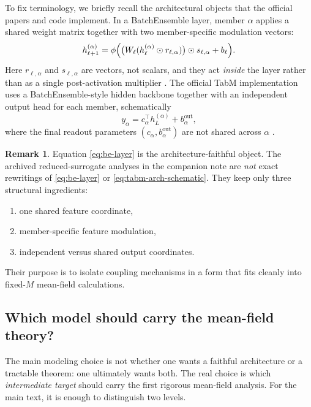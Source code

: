 \documentclass[11pt]{article}
\theoremstyle{definition}
\newtheorem{remark}[theorem]{Remark}
\begin{document}
To fix terminology, we briefly recall the architectural objects that the official papers and code implement.
In a BatchEnsemble layer, member $\alpha$ applies a shared weight matrix together with two member-specific modulation vectors:
\begin{equation}
  h_{\ell+1}^{(\alpha)}
  =
  \phi\Bigl(
    \bigl(
      W_\ell(h_\ell^{(\alpha)}\odot r_{\ell,\alpha})
    \bigr)
    \odot s_{\ell,\alpha}
    +
    b_\ell
  \Bigr).
  \label{eq:be-layer}
\end{equation}
Here $r_{\ell,\alpha}$ and $s_{\ell,\alpha}$ are vectors, not scalars,
and they act \emph{inside} the layer rather than as a single post-activation multiplier
\cite{batchensemble}.
The official TabM implementation uses a BatchEnsemble-style hidden backbone together with an independent output head for each member,
schematically
\begin{equation}
  y_\alpha
  =
  c_\alpha^\top h_L^{(\alpha)} + b_\alpha^{\mathrm{out}},
  \label{eq:tabm-arch-schematic}
\end{equation}
where the final readout parameters $(c_\alpha,b_\alpha^{\mathrm{out}})$ are not shared across $\alpha$
\cite{tabm,tabm-repo}.

\begin{remark}
Equation \eqref{eq:be-layer} is the architecture-faithful object.
The archived reduced-surrogate analyses in the companion note are \emph{not} exact rewritings of \eqref{eq:be-layer} or \eqref{eq:tabm-arch-schematic}.
They keep only three structural ingredients:
\begin{enumerate}[leftmargin=2em]
  \item one shared feature coordinate,
  \item member-specific feature modulation,
  \item independent versus shared output coordinates.
\end{enumerate}
Their purpose is to isolate coupling mechanisms in a form that fits cleanly into fixed-$M$ mean-field calculations.
\end{remark}

\subsection{Which model should carry the mean-field theory?}

The main modeling choice is not whether one wants a faithful architecture or a tractable theorem:
one ultimately wants both.
The real choice is which \emph{intermediate target} should carry the first rigorous mean-field analysis.
For the main text, it is enough to distinguish two levels.
\end{document}

